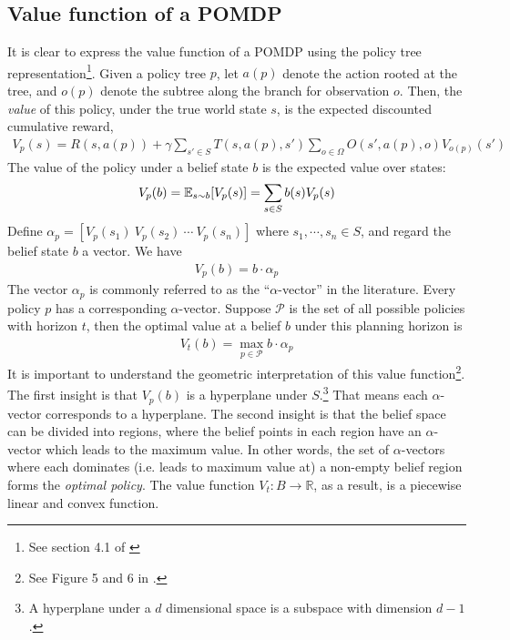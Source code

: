 \documentclass{article}
\begin{document}
\subsection{Value function of a POMDP}
It is clear to express the value function of a POMDP using the
policy tree representation\footnote{See section 4.1 of \citet{kaelbling1998planning}}.
Given a policy tree $p$, let $a(p)$ denote the action rooted at the tree, and
$o(p)$ denote the subtree along the branch for observation $o$. Then, the \emph{value}
of this policy, under the true world state $s$, is the expected discounted cumulative reward,
\begin{align}
V_p(s) = R(s,a(p)) + \gamma \sum_{s'\in S}T(s,a(p),s')\sum_{o\in\Omega}O(s',a(p),o) V_{o(p)}(s')
\end{align}
The value of the policy under a belief state $b$ is the expected value over states:
\begin{align}
V_p(b) = \mathbb{E}_{s\sim b} [V_p(s)] = \sum_{s\in S}b(s)V_p(s)
\end{align}
Define $\alpha_p=[ V_p(s_1)\ V_p(s_2)\ \cdots\ V_p(s_n)]$ where $s_1,\cdots,s_n\in S$, and regard the belief state $b$ a vector. We have
\begin{align}
V_p(b) = b\cdot \alpha_p
\end{align}
The vector $\alpha_p$ is commonly referred to as the ``$\alpha$-vector'' in the literature. Every policy $p$ has a corresponding $\alpha$-vector. Suppose $\mathcal{P}$ is the set of all possible policies with horizon $t$, then the optimal value at a belief $b$ under this planning horizon is
\begin{align}
V_t(b) = \max_{p\in\mathcal{P}} b\cdot \alpha_p
\end{align}
It is important to understand the geometric interpretation of this value function\footnote{See Figure 5 and 6 in \citet{kaelbling1998planning}.}. The first insight is that $V_p(b)$ is a hyperplane under $S$.\footnote{A hyperplane under a $d$ dimensional space is a subspace with dimension $d-1$.} That means each $\alpha$-vector corresponds to a hyperplane. The second insight is that the belief space can be divided into regions, where the belief points in each region have an $\alpha$-vector which leads to the maximum value. In other words, the set of $\alpha$-vectors where each dominates (i.e. leads to maximum value at) a non-empty belief region forms the \emph{optimal policy}. The value function $V_t:B\rightarrow \mathbb{R}$, as a result, is a piecewise linear and convex function.
\end{document}
